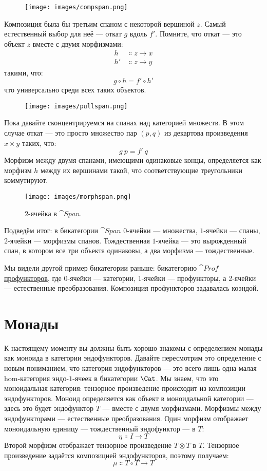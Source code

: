 \begin{figure}[H]
  \centering
  \texttt{[image: images/compspan.png]}
\end{figure}

\noindent
Композиция была бы третьим спаном с некоторой вершиной $z$. Самый
естественный выбор для неё — откат $g$ вдоль
$f'$. Помните, что откат — это объект $z$
вместе с двумя морфизмами:
\begin{align*}
  h  & \Colon z \to x \\
  h' & \Colon z \to y
\end{align*}
такими, что:
\[g \circ h = f' \circ h'\]
что универсально среди всех таких объектов.

\begin{figure}[H]
  \centering
  \texttt{[image: images/pullspan.png]}
\end{figure}

\noindent
Пока давайте сконцентрируемся на спанах над категорией множеств. В этом
случае откат — это просто множество пар $(p, q)$ из
декартова произведения $x \times y$ таких, что:
\[g\ p = f'\ q\]
Морфизм между двумя спанами, имеющими одинаковые концы, определяется как
морфизм $h$ между их вершинами такой, что соответствующие
треугольники коммутируют.

\begin{figure}[H]
  \centering
  \texttt{[image: images/morphspan.png]}
  \caption{$2$-ячейка в $\cat{Span}$.}
\end{figure}

\noindent
Подведём итог: в бикатегории $\cat{Span}$ $0$-ячейки — множества, $1$-ячейки —
спаны, $2$-ячейки — морфизмы спанов. Тождественная $1$-ячейка — это
вырожденный спан, в котором все три объекта одинаковы, а два
морфизма — тождественные.

Мы видели другой пример бикатегории раньше: бикатегорию
$\cat{Prof}$
\hyperref[ends-and-coends]{профункторов},
где 0-ячейки — категории, 1-ячейки — профункторы, а 2-ячейки —
естественные преобразования. Композиция профункторов задавалась
коэндой.

\section{Монады}

К настоящему моменту вы должны быть хорошо знакомы с определением монады как
моноида в категории эндофункторов. Давайте пересмотрим это определение
с новым пониманием, что категория эндофункторов — это всего лишь одна
малая hom-категория эндо-$1$-ячеек в бикатегории $\Cat$. Мы
знаем, что это моноидальная категория: тензорное произведение происходит из
композиции эндофункторов. Моноид определяется как объект в
моноидальной категории --- здесь это будет эндофунктор $T$ ---
вместе с двумя морфизмами. Морфизмы между эндофункторами — естественные
преобразования. Один морфизм отображает моноидальную единицу --- тождественный
эндофунктор --- в $T$:
\[\eta \Colon I \to T\]
Второй морфизм отображает тензорное произведение $T \otimes T$ в
$T$. Тензорное произведение задаётся композицией эндофункторов, поэтому
получаем:
\[\mu \Colon T \circ T \to T\]

